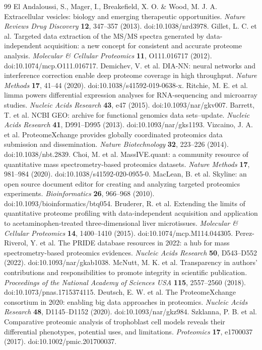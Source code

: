 \documentclass[11pt]{article}
\begin{document}
\begin{thebibliography}{99}
 El Andaloussi, S., Mager, I., Breakefield, X. O. \& Wood, M. J. A. Extracellular vesicles: biology and emerging therapeutic opportunities. \emph{Nature Reviews Drug Discovery} \textbf{12}, 347--357 (2013). doi:10.1038/nrd3978.
 Gillet, L. C. et al. Targeted data extraction of the MS/MS spectra generated by data-independent acquisition: a new concept for consistent and accurate proteome analysis. \emph{Molecular \& Cellular Proteomics} \textbf{11}, O111.016717 (2012). doi:10.1074/mcp.O111.016717.
 Demichev, V. et al. DIA-NN: neural networks and interference correction enable deep proteome coverage in high throughput. \emph{Nature Methods} \textbf{17}, 41--44 (2020). doi:10.1038/s41592-019-0638-x.
 Ritchie, M. E. et al. limma powers differential expression analyses for RNA-sequencing and microarray studies. \emph{Nucleic Acids Research} \textbf{43}, e47 (2015). doi:10.1093/nar/gkv007.
 Barrett, T. et al. NCBI GEO: archive for functional genomics data sets--update. \emph{Nucleic Acids Research} \textbf{41}, D991--D995 (2013). doi:10.1093/nar/gks1193.
 Vizcaino, J. A. et al. ProteomeXchange provides globally coordinated proteomics data submission and dissemination. \emph{Nature Biotechnology} \textbf{32}, 223--226 (2014). doi:10.1038/nbt.2839.
 Choi, M. et al. MassIVE.quant: a community resource of quantitative mass spectrometry-based proteomics datasets. \emph{Nature Methods} \textbf{17}, 981--984 (2020). doi:10.1038/s41592-020-0955-0.
 MacLean, B. et al. Skyline: an open source document editor for creating and analyzing targeted proteomics experiments. \emph{Bioinformatics} \textbf{26}, 966--968 (2010). doi:10.1093/bioinformatics/btq054.
 Bruderer, R. et al. Extending the limits of quantitative proteome profiling with data-independent acquisition and application to acetaminophen-treated three-dimensional liver microtissues. \emph{Molecular \& Cellular Proteomics} \textbf{14}, 1400--1410 (2015). doi:10.1074/mcp.M114.044305.
 Perez-Riverol, Y. et al. The PRIDE database resources in 2022: a hub for mass spectrometry-based proteomics evidences. \emph{Nucleic Acids Research} \textbf{50}, D543--D552 (2022). doi:10.1093/nar/gkab1038.
 McNutt, M. K. et al. Transparency in authors' contributions and responsibilities to promote integrity in scientific publication. \emph{Proceedings of the National Academy of Sciences USA} \textbf{115}, 2557--2560 (2018). doi:10.1073/pnas.1715374115.
 Deutsch, E. W. et al. The ProteomeXchange consortium in 2020: enabling big data approaches in proteomics. \emph{Nucleic Acids Research} \textbf{48}, D1145--D1152 (2020). doi:10.1093/nar/gkz984.
 Szklanna, P. B. et al. Comparative proteomic analysis of trophoblast cell models reveals their differential phenotypes, potential uses, and limitations. \emph{Proteomics} \textbf{17}, e1700037 (2017). doi:10.1002/pmic.201700037.
\end{thebibliography}
\end{document}
